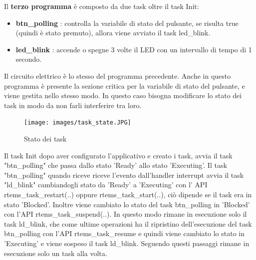 \documentclass[12pt, a4paper, titlepage, oneside]{book}
\begin{document}
\newpage
Il \textbf{terzo programma} è composto da due task oltre il task Init:
\begin{itemize}
    \item \textbf{btn\_polling} : controlla la variabile di stato del pulsante, se risulta true (quindi è stato  premuto), allora viene avviato il task led\_blink.
    \item \textbf{led\_blink} : accende o spegne 3 volte il LED con un intervallo di tempo di 1 secondo.
\end{itemize}
Il circuito elettrico è lo stesso del programma precedente.
Anche in questo programma è presente la sezione critica per la variabile di stato del pulsante, e viene gestita nello stesso modo.
In questo caso bisogna modificare lo stato dei task in modo da non farli interferire tra loro.\newline
\begin{figure}[h]
    \centering
    \texttt{[image: images/task\_state.JPG]}
    \caption{Stato dei task}
    \label{fig:Stato dei task}
\end{figure}
Il task Init dopo aver configurato l'applicativo e creato i task, avvia il task "btn\_polling" che passa dallo stato 'Ready' allo stato 'Executing'.
Il task "btn\_polling" quando riceve riceve l'evento dall'handler interrupt avvia il task "ld\_blink" cambiandogli stato da 'Ready' a 'Executing' con l' API rtems\_task\_restart(..) oppure rtems\_task\_start(..), ciò dipende se il task era in stato 'Blocked'. Inoltre viene cambiato lo stato del task btn\_polling in 'Blocked' con l'API rtems\_task\_suspend(..).\newline
In questo modo rimane in esecuzione solo il task ld\_blink, che come ultime operazioni ha il  ripristino dell'esecuzione del task btn\_polling con l'API rtems\_task\_resume e quindi viene cambiato lo stato in 'Executing' e viene sospeso il task ld\_blink.\newline
Seguendo questi passaggi rimane in esecuzione solo un task alla volta.
\newpage
\end{document}
